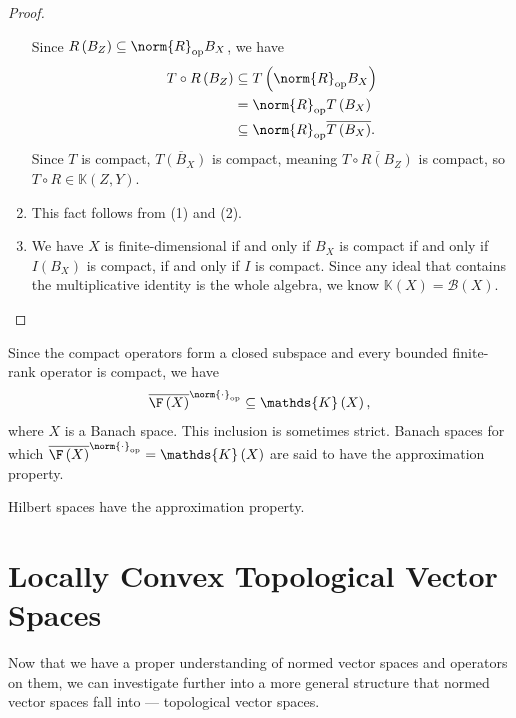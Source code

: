 \documentclass[10pt]{mypackage}
\begin{document}
\begin{proof}
\begin{enumerate}[(1)]
      Since $R\left(B_{Z}\right)\subseteq \norm{R}_{\text{op}}B_X$, we have
      \begin{align*}
        T\circ R\left(B_{Z}\right) &\subseteq T\left(\norm{R}_{\text{op}}B_X\right)\\
                                   &= \norm{R}_{\text{op}}T\left(B_{X}\right)\\
                                   &\subseteq \norm{R}_{\text{op}}\overline{T\left(B_{X}\right)}.
      \end{align*}
      Since $T$ is compact, $\overline{T\left(B_{X}\right)}$ is compact, meaning $\overline{T\circ R\left(B_{Z}\right)}$ is compact, so $T\circ R\in \mathds{K}\left(Z,Y\right)$.
    \item This fact follows from (1) and (2).
    \item We have $X$ is finite-dimensional if and only if $B_{X}$ is compact if and only if $I\left(B_{X}\right)$ is compact, if and only if $I$ is compact. Since any ideal that contains the multiplicative identity is the whole algebra, we know $\mathds{K}\left(X\right) = \mathcal{B}\left(X\right)$.
  \end{enumerate}
  
\end{proof}
\begin{remark}
  Since the compact operators form a closed subspace and every bounded finite-rank operator is compact, we have
  \begin{align*}
    \overline{\F\left(X\right)}^{\norm{\cdot}_{\text{op}}} \subseteq \mathds{K}\left(X\right),
  \end{align*}
  where $X$ is a Banach space. This inclusion is sometimes strict. Banach spaces for which $\overline{\F\left(X\right)}^{\norm{\cdot}_{\text{op}}} = \mathds{K}\left(X\right)$ are said to have the approximation property.\newline

  Hilbert spaces have the approximation property.
\end{remark}
\section{Locally Convex Topological Vector Spaces}%
Now that we have a proper understanding of normed vector spaces and operators on them, we can investigate further into a more general structure that normed vector spaces fall into --- topological vector spaces. 
\end{document}
